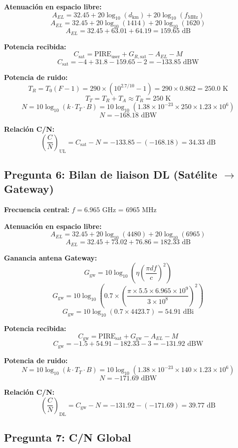 \documentclass[a4paper,11pt]{article}
\begin{document}
\textbf{Atenuación en espacio libre:}
$$A_{EL} = 32.45 + 20\log_{10}(d_{\text{km}}) + 20\log_{10}(f_{\text{MHz}})$$
$$A_{EL} = 32.45 + 20\log_{10}(1414) + 20\log_{10}(1620)$$
$$A_{EL} = 32.45 + 63.01 + 64.19 = 159.65 \text{ dB}$$

\textbf{Potencia recibida:}
$$C_{\text{sat}} = \text{PIRE}_{\text{user}} + G_{R,\text{sat}} - A_{EL} - M$$
$$C_{\text{sat}} = -4 + 31.8 - 159.65 - 2 = -133.85 \text{ dBW}$$

\textbf{Potencia de ruido:}
$$T_R = T_0(F - 1) = 290 \times (10^{2.7/10} - 1) = 290 \times 0.862 = 250.0 \text{ K}$$
$$T_T = T_R + T_A \approx T_R = 250 \text{ K}$$
$$N = 10\log_{10}(k \cdot T_T \cdot B) = 10\log_{10}(1.38 \times 10^{-23} \times 250 \times 1.23 \times 10^6)$$
$$N = -168.18 \text{ dBW}$$

\textbf{Relación C/N:}
$$\left(\frac{C}{N}\right)_{\text{UL}} = C_{\text{sat}} - N = -133.85 - (-168.18) = 34.33 \text{ dB}$$

\subsection*{Pregunta 6: Bilan de liaison DL (Satélite $\rightarrow$ Gateway)}

\textbf{Frecuencia central:} $f = 6.965$ GHz = 6965 MHz

\textbf{Atenuación en espacio libre:}
$$A_{EL} = 32.45 + 20\log_{10}(4480) + 20\log_{10}(6965)$$
$$A_{EL} = 32.45 + 73.02 + 76.86 = 182.33 \text{ dB}$$

\textbf{Ganancia antena Gateway:}
$$G_{\text{gw}} = 10\log_{10}\left(\eta \left(\frac{\pi d f}{c}\right)^2\right)$$
$$G_{\text{gw}} = 10\log_{10}\left(0.7 \times \left(\frac{\pi \times 5.5 \times 6.965 \times 10^9}{3 \times 10^8}\right)^2\right)$$
$$G_{\text{gw}} = 10\log_{10}(0.7 \times 4423.7) = 54.91 \text{ dBi}$$

\textbf{Potencia recibida:}
$$C_{\text{gw}} = \text{PIRE}_{\text{sat}} + G_{\text{gw}} - A_{EL} - M$$
$$C_{\text{gw}} = -1.5 + 54.91 - 182.33 - 3 = -131.92 \text{ dBW}$$

\textbf{Potencia de ruido:}
$$N = 10\log_{10}(k \cdot T_T \cdot B) = 10\log_{10}(1.38 \times 10^{-23} \times 140 \times 1.23 \times 10^6)$$
$$N = -171.69 \text{ dBW}$$

\textbf{Relación C/N:}
$$\left(\frac{C}{N}\right)_{\text{DL}} = C_{\text{gw}} - N = -131.92 - (-171.69) = 39.77 \text{ dB}$$

\subsection*{Pregunta 7: C/N Global}
\end{document}
